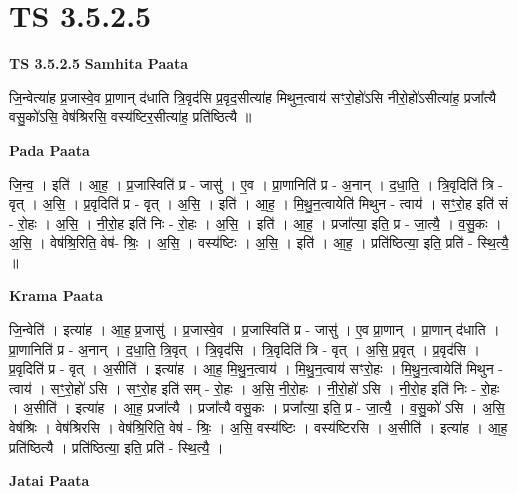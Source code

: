 \documentclass[17pt]{extarticle}
\begin{document}
\section{ TS 3.5.2.5 }

\textbf{TS 3.5.2.5 } \newline
\textbf{Samhita Paata} \newline

जि॒न्वेत्या॑ह प्र॒जास्वे॒व प्रा॒णान् द॑धाति त्रि॒वृद॑सि प्र॒वृद॒सीत्या॑ह मिथुन॒त्वाय॑ सꣳरो॒हो॑ऽसि नीरो॒हो॑ऽसीत्या॑ह॒ प्रजा᳚त्यै वसु॒को॑ऽसि॒ वेष॑श्रिरसि॒ वस्य॑ष्टिर॒सीत्या॑ह॒ प्रति॑ष्ठित्यै ॥ \newline

\textbf{Pada Paata} \newline

जि॒न्व॒ । इति॑ । आ॒ह॒ । प्र॒जास्विति॑ प्र - जासु॑ । ए॒व । प्रा॒णानिति॑ प्र - अ॒नान् । द॒धा॒ति॒ । त्रि॒वृदिति॑ त्रि - वृत् । अ॒सि॒ । प्र॒वृदिति॑ प्र - वृत् । अ॒सि॒ । इति॑ । आ॒ह॒ । मि॒थु॒न॒त्वायेति॑ मिथुन - त्वाय॑ । सꣳ॒॒रो॒ह इति॑ सं - रो॒हः । अ॒सि॒ । नी॒रो॒ह इति॑ निः - रो॒हः । अ॒सि॒ । इति॑ । आ॒ह॒ । प्रजा᳚त्या॒ इति॒ प्र - जा॒त्यै॒ । व॒सु॒कः । अ॒सि॒ । वेष॑श्रि॒रिति॒ वेष॑- श्रिः॒ । अ॒सि॒ । वस्य॑ष्टिः । अ॒सि॒ । इति॑ । आ॒ह॒ । प्रति॑ष्ठित्या॒ इति॒ प्रति॑ - स्थि॒त्यै॒ ॥  \newline


\textbf{Krama Paata} \newline

जि॒न्वेति॑ । इत्या॑ह । आ॒ह॒ प्र॒जासु॑ । प्र॒जास्वे॒व । प्र॒जास्विति॑ प्र - जासु॑ । ए॒व प्रा॒णान् । प्रा॒णान् द॑धाति । प्रा॒णानिति॑ प्र - अ॒नान् । द॒धा॒ति॒ त्रि॒वृत् । त्रि॒वृद॑सि । त्रि॒वृदिति॑ त्रि - वृत् । अ॒सि॒ प्र॒वृत् । प्र॒वृद॑सि । प्र॒वृदिति॑ प्र - वृत् । अ॒सीति॑ । इत्या॑ह । आ॒ह॒ मि॒थु॒न॒त्वाय॑ । मि॒थु॒न॒त्वाय॑ सꣳरो॒हः । मि॒थु॒न॒त्वायेति॑ मिथुन - त्वाय॑ । सꣳ॒॒रो॒हो॑ ऽसि । सꣳ॒॒रो॒ह इति॑ सम् - रो॒हः । अ॒सि॒ नी॒रो॒हः । नी॒रो॒हो॑ ऽसि । नी॒रो॒ह इति॑ निः - रो॒हः । अ॒सीति॑ । इत्या॑ह । आ॒ह॒ प्रजा᳚त्यै । प्रजा᳚त्यै वसु॒कः । प्रजा᳚त्या॒ इति॒ प्र - जा॒त्यै॒ । व॒सु॒को॑ ऽसि । अ॒सि॒ वेष॑श्रिः । वेष॑श्रिरसि । वेष॑श्रि॒रिति॒ वेष॑ - श्रिः॒ । अ॒सि॒ वस्य॑ष्टिः । वस्य॑ष्टिरसि । अ॒सीति॑ । इत्या॑ह । आ॒ह॒ प्रति॑ष्ठित्यै । प्रति॑ष्ठित्या॒ इति॒ प्रति॑ - स्थि॒त्यै॒ । \newline

\textbf{Jatai Paata} \newline
\end{document}

